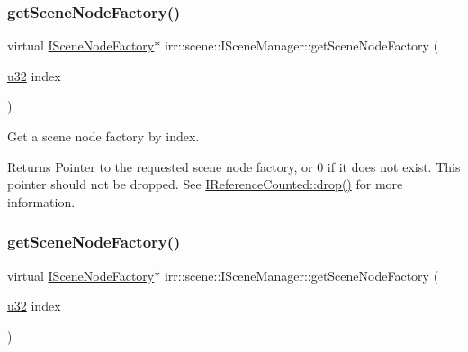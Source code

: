\subsubsection{\texorpdfstring{get\+Scene\+Node\+Factory()}{getSceneNodeFactory()}\hspace{0.1cm}{\footnotesize\ttfamily [1/2]}}
{\footnotesize\ttfamily virtual \hyperlink{classirr_1_1scene_1_1ISceneNodeFactory}{I\+Scene\+Node\+Factory}$\ast$ irr\+::scene\+::\+I\+Scene\+Manager\+::get\+Scene\+Node\+Factory (\begin{DoxyParamCaption}\item[{\hyperlink{namespaceirr_a0416a53257075833e7002efd0a18e804}{u32}}]{index }\end{DoxyParamCaption})\hspace{0.3cm}{\ttfamily [pure virtual]}}



Get a scene node factory by index. 

\begin{DoxyReturn}{Returns}
Pointer to the requested scene node factory, or 0 if it does not exist. This pointer should not be dropped. See \hyperlink{classirr_1_1IReferenceCounted_a03856a09355b89d178090c4a5f738543}{I\+Reference\+Counted\+::drop()} for more information. 
\end{DoxyReturn}
\mbox{\label{classirr_1_1scene_1_1ISceneManager_ac912b9effd5ce46f5dc038e0568e614c}} 
\subsubsection{\texorpdfstring{get\+Scene\+Node\+Factory()}{getSceneNodeFactory()}\hspace{0.1cm}{\footnotesize\ttfamily [2/2]}}
{\footnotesize\ttfamily virtual \hyperlink{classirr_1_1scene_1_1ISceneNodeFactory}{I\+Scene\+Node\+Factory}$\ast$ irr\+::scene\+::\+I\+Scene\+Manager\+::get\+Scene\+Node\+Factory (\begin{DoxyParamCaption}\item[{\hyperlink{namespaceirr_a0416a53257075833e7002efd0a18e804}{u32}}]{index }\end{DoxyParamCaption})\hspace{0.3cm}{\ttfamily [pure virtual]}}



